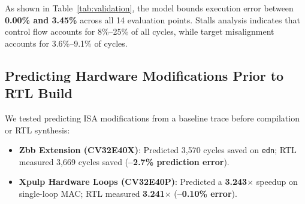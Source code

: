\documentclass[conference]{IEEEtran}
\begin{document}
\begin{table}[t]
\centering
\caption{PARISCV v2 Cycle Model Accuracy vs. Real Verilator RTL}
\label{tab:validation}
\end{table}

As shown in Table~\ref{tab:validation}, the model bounds execution error between \textbf{0.00\% and 3.45\%} across all 14 evaluation points. Stalls analysis indicates that control flow accounts for 8\%--25\% of all cycles, while target misalignment accounts for 3.6\%--9.1\% of cycles.

\subsection{Predicting Hardware Modifications Prior to RTL Build}
We tested predicting ISA modifications from a baseline trace before compilation or RTL synthesis:
\begin{itemize}
    \item \textbf{Zbb Extension (CV32E40X)}: Predicted 3,570 cycles saved on \texttt{edn}; RTL measured 3,669 cycles saved (\textbf{--2.7\% prediction error}).
    \item \textbf{Xpulp Hardware Loops (CV32E40P)}: Predicted a \textbf{3.243$\times$} speedup on single-loop MAC; RTL measured \textbf{3.241$\times$} (\textbf{--0.10\% error}).
\end{itemize}
\end{document}
